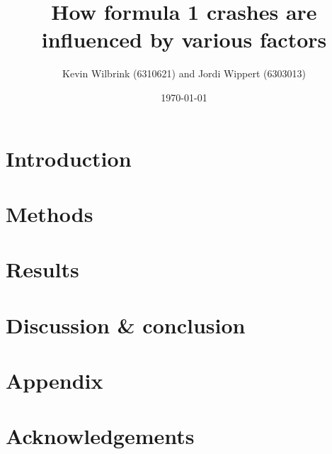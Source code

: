 \documentclass[12pt]{article}
\title{\textbf{How formula 1 crashes are influenced by various factors}}
\date{\today}
\author{Kevin Wilbrink (6310621) and Jordi Wippert (6303013)}
\begin{document}
	\maketitle

	\begin{multicols*}{2}
		\begin{abstract}
			\textbf{}
		\end{abstract}


		\section{Introduction}
		

		\section{Methods}
		

		\section{Results}
		

    \section{Discussion \& conclusion}
		

		\section*{Appendix}
		

		\section*{Acknowledgements}
		

		
	\end{multicols*}
\end{document}
